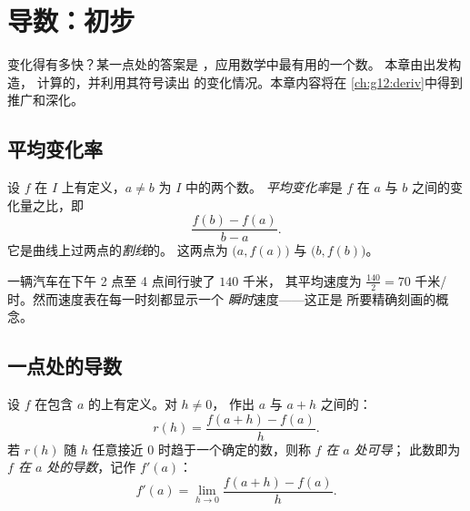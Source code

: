 \chapter{导数：初步}\label{ch:g11:deriv}

变化得有多快？某一点处的答案是
\emph{}，应用数学中最有用的一个数。
本章由出发构造，
计算的，并利用其符号读出
的变化情况。本章内容将在
\cref{ch:g12:deriv}中得到推广和深化。

\section{平均变化率}

\begin{definition}[平均变化率]\label{def:g11:deriv:rate}
设 $f$ 在 $I$ 上有定义，$a \neq b$ 为 $I$ 中的两个数。
\emph{平均变化率}是 $f$ 在
$a$ 与 $b$ 之间的变化量之比，即
\[
\frac{f(b) - f(a)}{b - a}.
\]
它是曲线上过两点的\emph{割线}的。
这两点为 $\bigl(a, f(a)\bigr)$ 与 $\bigl(b, f(b)\bigr)$。
\end{definition}

\begin{example}
一辆汽车在下午 2 点至 4 点间行驶了 $140$ 千米，
其平均速度为 $\frac{140}{2} = 70$ 千米/时。然而速度表在每一时刻都显示一个
\emph{瞬时}速度——这正是
所要精确刻画的概念。
\end{example}

\section{一点处的导数}

\begin{definition}[一点处的导数]\label{def:g11:deriv:derivative}
设 $f$ 在包含 $a$ 的上有定义。对 $h \neq 0$，
作出 $a$ 与 $a + h$ 之间的：
\[
r(h) = \frac{f(a+h) - f(a)}{h}.
\]
若 $r(h)$ 随 $h$ 任意接近
$0$ 时趋于一个确定的数，则称 $f$ \emph{在 $a$ 处可导}；
此数即为\emph{$f$ 在 $a$ 处的导数}，记作 $f'(a)$：
\[
f'(a) = \lim_{h \to 0} \frac{f(a+h) - f(a)}{h}.
\]
\end{definition}

